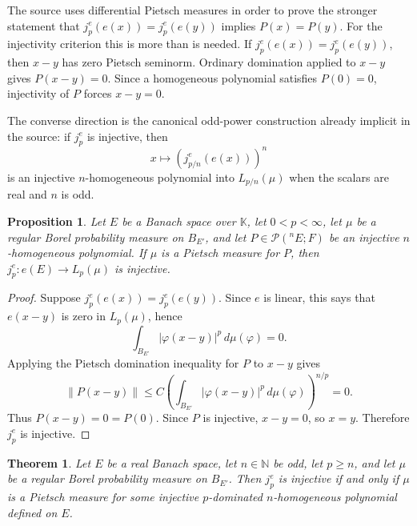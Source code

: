 \documentclass[11pt]{article}
\newtheorem{theorem}{Theorem}
\newtheorem{proposition}{Proposition}
\newcommand{\K}{\mathbb K}
\newcommand{\calP}{\mathcal P}
\begin{document}
The source uses differential Pietsch measures in order to prove the
stronger statement that \(j_p^e(e(x))=j_p^e(e(y))\) implies
\(P(x)=P(y)\).  For the injectivity criterion this is more than is
needed.  If \(j_p^e(e(x))=j_p^e(e(y))\), then \(x-y\) has zero Pietsch
seminorm.  Ordinary domination applied to \(x-y\) gives \(P(x-y)=0\).
Since a homogeneous polynomial satisfies \(P(0)=0\), injectivity of
\(P\) forces \(x-y=0\).

The converse direction is the canonical odd-power construction already
implicit in the source: if \(j_p^e\) is injective, then
\[
  x\longmapsto (j_{p/n}^e(e(x)))^n
\]
is an injective \(n\)-homogeneous polynomial into \(L_{p/n}(\mu)\) when
the scalars are real and \(n\) is odd.

\begin{proposition}
\label{prop:ordinary-implies-injective}
Let \(E\) be a Banach space over \(\K\), let \(0<p<\infty\), let
\(\mu\) be a regular Borel probability measure on \(B_{E'}\), and let
\(P\in\calP(^nE;F)\) be an injective \(n\)-homogeneous polynomial.  If
\(\mu\) is a Pietsch measure for \(P\), then \(j_p^e:e(E)\to L_p(\mu)\)
is injective.
\end{proposition}

\begin{proof}
Suppose \(j_p^e(e(x))=j_p^e(e(y))\).  Since \(e\) is linear, this says
that \(e(x-y)\) is zero in \(L_p(\mu)\), hence
\[
  \int_{B_{E'}}|\varphi(x-y)|^p\,d\mu(\varphi)=0.
\]
Applying the Pietsch domination inequality for \(P\) to \(x-y\) gives
\[
  \|P(x-y)\|\le
  C\left(\int_{B_{E'}}|\varphi(x-y)|^p\,d\mu(\varphi)\right)^{n/p}=0.
\]
Thus \(P(x-y)=0=P(0)\).  Since \(P\) is injective, \(x-y=0\), so
\(x=y\).  Therefore \(j_p^e\) is injective.
\end{proof}

\begin{theorem}
\label{thm:ordinary-criterion}
Let \(E\) be a real Banach space, let \(n\in\mathbb N\) be odd, let
\(p\ge n\), and let \(\mu\) be a regular Borel probability measure on
\(B_{E'}\).  Then \(j_p^e\) is injective if and only if \(\mu\) is a
Pietsch measure for some injective \(p\)-dominated \(n\)-homogeneous
polynomial defined on \(E\).
\end{theorem}
\end{document}
